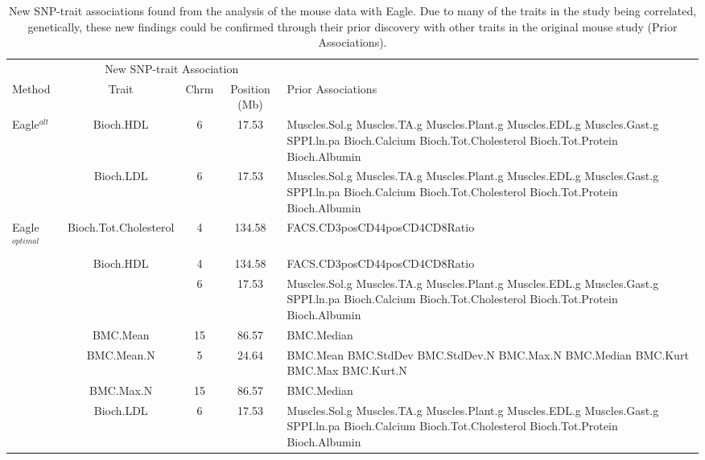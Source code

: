 \documentclass{article}
\begin{document}
\begin{table}[h]
\scriptsize
\caption{New SNP-trait associations found from the analysis of the mouse data with Eagle.  Due to many of the traits in the study 
being correlated, genetically,  these new findings could be confirmed through their prior discovery with other traits in the original 
mouse study (Prior Associations). }
\label{suptabnew}
\vspace{0.5cm}
\begin{tabular}{lcccp{6cm}}  \hline
     & \multicolumn{3}{c}{New SNP-trait Association}  &  \\  \cline{2-4}
Method           &  Trait  & Chrm  &  Position (Mb)  & \hfil Prior Associations  \\  \hline  
Eagle$^{alt}$  & Bioch.HDL   & 6   & 17.53         & Muscles.Sol.g Muscles.TA.g Muscles.Plant.g Muscles.EDL.g  Muscles.Gast.g 
     SPPI.ln.pa Bioch.Calcium    Bioch.Tot.Cholesterol Bioch.Tot.Protein Bioch.Albumin \\ 
                       & Bioch.LDL   & 6    &  17.53        & Muscles.Sol.g Muscles.TA.g Muscles.Plant.g Muscles.EDL.g  Muscles.Gast.g SPPI.ln.pa Bioch.Calcium  Bioch.Tot.Cholesterol Bioch.Tot.Protein Bioch.Albumin \\  
 Eagle$^{optimal}$  &        Bioch.Tot.Cholesterol  & 4      &  134.58  & FACS.CD3posCD44posCD4CD8Ratio  \\
                        & Bioch.HDL                  & 4      &  134.58  & FACS.CD3posCD44posCD4CD8Ratio   \\
                        &                                    & 6      &    17.53   & Muscles.Sol.g Muscles.TA.g Muscles.Plant.g Muscles.EDL.g  Muscles.Gast.g 
     SPPI.ln.pa Bioch.Calcium    Bioch.Tot.Cholesterol Bioch.Tot.Protein Bioch.Albumin  \\
                        & BMC.Mean                 & 15    &     86.57  & BMC.Median \\
                        & BMC.Mean.N             &  5     &     24.64   &  BMC.Mean BMC.StdDev BMC.StdDev.N  BMC.Max.N  BMC.Median BMC.Kurt
                        BMC.Max BMC.Kurt.N  \\
                        & BMC.Max.N               & 15    &      86.57  & BMC.Median \\
                        & Bioch.LDL                  & 6      &   17.53   & Muscles.Sol.g Muscles.TA.g Muscles.Plant.g Muscles.EDL.g  Muscles.Gast.g 
     SPPI.ln.pa Bioch.Calcium    Bioch.Tot.Cholesterol Bioch.Tot.Protein Bioch.Albumin  \\  \hline
                                           
                       
                    

\end{tabular}
\end{table}
\end{document}
